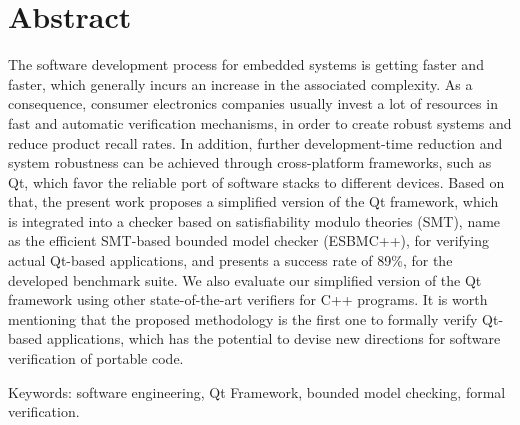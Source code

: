 \chapter*{Abstract}
\thispagestyle{empty}


The software development process for embedded systems is getting faster and faster, which generally incurs an increase in the associated complexity. As a consequence, consumer electronics companies usually invest a lot of resources in fast and automatic verification mechanisms, in order to create robust systems and reduce product recall rates. In addition, further development-time reduction and system robustness can be achieved through cross-platform frameworks, such as Qt, which favor the reliable port of software stacks to different devices. Based on that, the present work proposes a simplified version of the Qt framework, which is integrated into a checker based on satisfiability modulo theories (SMT), name as the efficient SMT-based bounded model checker (ESBMC++), for verifying actual Qt-based applications, and presents a success rate of 89\%, for the developed benchmark suite. We also evaluate our simplified version of the Qt framework using other state-of-the-art verifiers for C++ programs. It is worth mentioning that the proposed methodology is the first one to formally verify Qt-based applications, which has the potential to devise new directions for software verification of portable code.


\noindent \textsf{Keywords:} software engineering, Qt Framework, bounded model checking, formal verification.


\cleardoublepage
